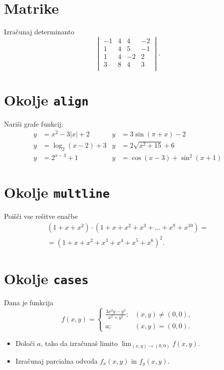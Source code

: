 \documentclass[a4paper,12pt]{article}
\begin{document}
\section*{Matrike}
Izračunaj determinanto
\[\begin{vmatrix}
    -1 & 4 & 4 & -2 \\
    1 & 4 & 5 & -1 \\
    1 & 4 & -2 & 2 \\
    3 & 8 & 4 & 3 \\
\end{vmatrix}.\]

\section*{Okolje \texttt{align}}
Nariši grafe funkcij:
\begin{align*}
y& = x^2 - 3|x| + 2   & y& = 3 \sin(\pi+x) - 2 \\
y& = \log_2(x-2) + 3  & y& = 2 \sqrt{x^2+15} + 6 \\
y& = 2^{x-3} + 1      & y& = \cos(x-3) + \sin^2(x+1)
\end{align*}

\section*{Okolje \texttt{multline}}
Poišči vse rešitve enačbe
\begin{multline*}
(1+x+x^2) \cdot (1+x+x^2+x^3+\ldots+x^9+x^{10}) = \\
=(1+x+x^2+x^3+x^4+x^5+x^6)^2.
\end{multline*}

\section*{Okolje \texttt{cases}}
Dana je funkcija
\[f(x,y) =
\begin{cases}
   \frac{3x^2y-y^3}{x^2+y^2}; & (x,y) \ne (0,0), \\
   a; &(x,y) = (0,0).
\end{cases}\]
\begin{itemize}
\item Določi \(a\), tako da izračunaš limito \( \lim_{(x,y)\to(0,0)} f(x,y) \).
\item Izračunaj parcialna odvoda \(f_x(x,y)\) in \(f_y(x,y)\).
\end{itemize}
\end{document}
